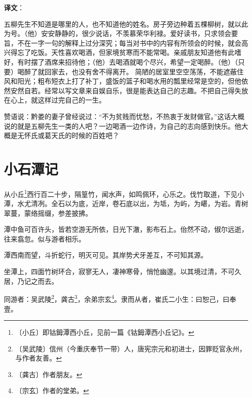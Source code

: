 \documentclass[12pt,UTF-8,openany]{ctexbook}
\begin{document}
\newpage

\textbf{译文}：

\vspace{1em}

\begin{normalsize}
    
    五柳先生不知道是哪里的人，也不知道他的姓名。房子旁边种着五棵柳树，就以此为号。（他）安安静静的，很少说话，不羡慕荣华利禄。爱好读书，只求领会要旨，不在一字一句的解释上过分深究；每当对书中的内容有所领会的时候，就会高兴得忘了吃饭。天性喜欢喝酒，但家境贫寒而不能常喝。亲戚朋友知道他有此嗜好，有时摆了酒席来招待他；（他）去喝酒就喝个尽兴，希望一定喝醉。（他）（只要）喝醉了就回家去，也没有舍不得离开。 简陋的居室里空空荡荡，不能遮蔽住风和阳光；粗布短衣上打了补丁，盛饭的篮子和喝水用的瓢里经常是空的，但他依然安然自若。经常以写文章来自娱自乐，很是能表达自己的志趣。不把自己得失放在心上，就这样过完自己的一生。
    
    赞语说：黔娄的妻子曾经说过：“不为贫贱而忧愁，不热衷于发财做官。”这话大概说的就是五柳先生一类的人吧？一边喝酒一边作诗，为自己的志向感到快乐。他大概是无怀氏或葛天氏的时候的百姓吧？
    
\end{normalsize}



\chapter{小石潭记}

\begin{normalsize}
    
    从小丘\footnote{〔小丘〕即钴鉧潭西小丘，见前一篇《钴鉧潭西小丘记》。}西行百二十步，隔篁竹，闻水声，如鸣佩环，心乐之。伐竹取道，下见小潭，水尤清冽。全石以为底，近岸，卷石底以出，为坻，为屿，为嵁，为岩。青树翠蔓，蒙络摇缀，参差披拂。
    
    潭中鱼可百许头，皆若空游无所依，日光下澈，影布石上。佁然不动，俶尔远逝，往来翕忽。似与游者相乐。
    
    潭西南而望，斗折蛇行，明灭可见。其岸势犬牙差互，不可知其源。
    
    坐潭上，四面竹树环合，寂寥无人，凄神寒骨，悄怆幽邃。以其境过清，不可久居，乃记之而去。
    
    同游者：吴武陵\footnote{〔吴武陵〕信州（今重庆奉节一带）人，唐宪宗元和初进士，因罪贬官永州，与作者友善。}，龚古\footnote{〔龚古〕作者朋友。}，余弟宗玄\footnote{〔宗玄〕作者的堂弟。}。隶而从者，崔氏二小生：曰恕己，曰奉壹。
\end{normalsize}
\end{document}
